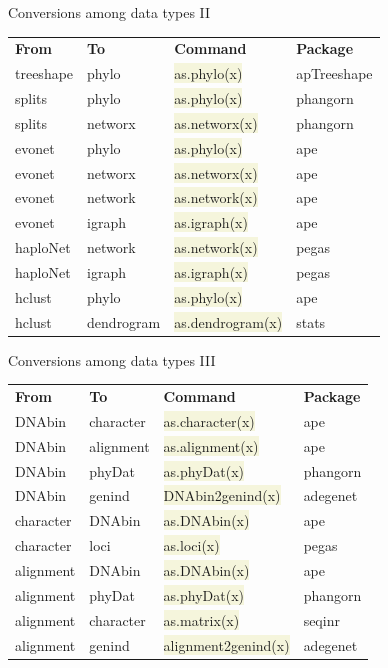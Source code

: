 \documentclass[compress, xelatex, 11pt, xcolor=svgnames, aspectratio=169, url={hyphens, lowtilde}]{beamer}
\renewcommand{\texttt}[1]{\colorbox{Beige}{{\ttfamily #1}}}
\begin{document}
\begin{frame}{Conversions among data types II}
	\begin{tabular}{llll}
		\textbf{From} & \textbf{To} & \textbf{Command} & \textbf{Package}\\
		treeshape & phylo & \texttt{as.phylo(x)} & apTreeshape\\
		splits & phylo & \texttt{as.phylo(x)} & phangorn\\
		splits & networx & \texttt{as.networx(x)} & phangorn\\
		evonet & phylo & \texttt{as.phylo(x)} & ape\\
		evonet & networx & \texttt{as.networx(x)} & ape\\
		evonet & network & \texttt{as.network(x)} & ape\\
		evonet & igraph & \texttt{as.igraph(x)} & ape\\
		haploNet & network & \texttt{as.network(x)} & pegas\\
		haploNet & igraph & \texttt{as.igraph(x)} & pegas\\
		hclust & phylo & \texttt{as.phylo(x)} & ape\\
		hclust & dendrogram & \texttt{as.dendrogram(x)} & stats
	\end{tabular}
\end{frame}

\begin{frame}{Conversions among data types III}
	\begin{tabular}{llll}
		\textbf{From} & \textbf{To} & \textbf{Command} & \textbf{Package}\\
		DNAbin & character & \texttt{as.character(x)} & ape\\
		DNAbin & alignment & \texttt{as.alignment(x)} & ape\\
		DNAbin & phyDat & \texttt{as.phyDat(x)} & phangorn\\
		DNAbin & genind & \texttt{DNAbin2genind(x)} & adegenet\\
		character & DNAbin & \texttt{as.DNAbin(x)} & ape\\
		character & loci & \texttt{as.loci(x)} & pegas\\
		alignment & DNAbin & \texttt{as.DNAbin(x)} & ape\\
		alignment & phyDat & \texttt{as.phyDat(x)} & phangorn\\
		alignment & character & \texttt{as.matrix(x)} & seqinr\\
		alignment & genind & \texttt{alignment2genind(x)} & adegenet
	\end{tabular}
\end{frame}
\end{document}
